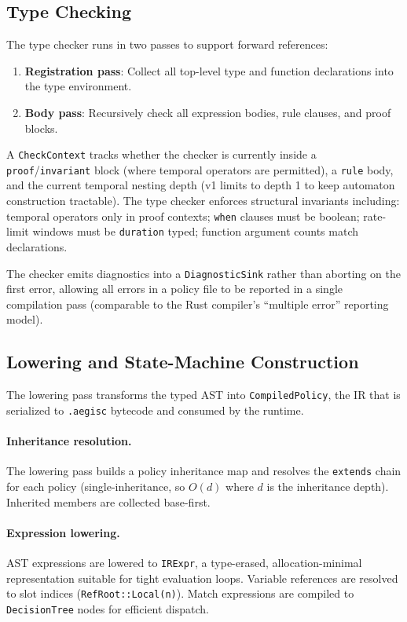 \documentclass[sigconf]{acmart}
\begin{document}
\subsection{Type Checking}

The type checker runs in two passes to support forward references:

\begin{enumerate}
  \item \textbf{Registration pass}: Collect all top-level type and function
    declarations into the type environment.
  \item \textbf{Body pass}: Recursively check all expression bodies, rule
    clauses, and proof blocks.
\end{enumerate}

A \texttt{CheckContext} tracks whether the checker is currently inside a
\texttt{proof}/\texttt{invariant} block (where temporal operators are
permitted), a \texttt{rule} body, and the current temporal nesting depth (v1
limits to depth 1 to keep automaton construction tractable). The type checker
enforces structural invariants including: temporal operators only in proof
contexts; \texttt{when} clauses must be boolean; rate-limit windows must be
\texttt{duration} typed; function argument counts match declarations.

The checker emits diagnostics into a \texttt{DiagnosticSink} rather than
aborting on the first error, allowing all errors in a policy file to be
reported in a single compilation pass (comparable to the Rust compiler's
``multiple error'' reporting model).

\subsection{Lowering and State-Machine Construction}
\label{sec:lowering}

The lowering pass transforms the typed AST into \texttt{CompiledPolicy}, the
IR that is serialized to \texttt{.aegisc} bytecode and consumed by the runtime.

\paragraph{Inheritance resolution.}
The lowering pass builds a policy inheritance map and resolves the
\texttt{extends} chain for each policy (single-inheritance, so $O(d)$ where
$d$ is the inheritance depth). Inherited members are collected base-first.

\paragraph{Expression lowering.}
AST expressions are lowered to \texttt{IRExpr}, a type-erased,
allocation-minimal representation suitable for tight evaluation loops. Variable
references are resolved to slot indices (\texttt{RefRoot::Local(n)}). Match
expressions are compiled to \texttt{DecisionTree} nodes for efficient dispatch.
\end{document}
